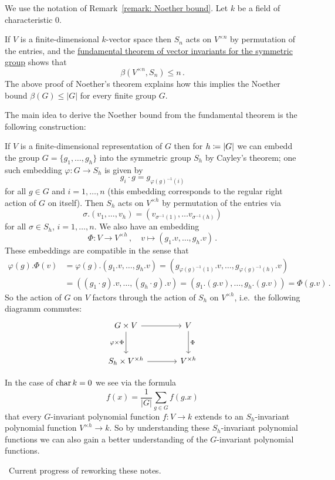 \begin{fluff}
  We use the notation of Remark~\ref{remark: Noether bound}.
  Let $k$ be a field of characteristic $0$.
  
  If $V$ is a finite-dimensional $k$-vector space then $S_n$ acts on $V^{\times n}$ by permutation of the entries, and the \hyperref[theorem: fundamental theorem of vector invariants for the symmetric group]{fundamental theorem of vector invariants for the symmetric group} shows that
  \[
          \beta(V^{\times n}, S_n)
    \leq  n \,.
  \]
  The above proof of Noether’s theorem explains how this implies the Noether bound $\beta(G) \leq |G|$ for every finite group $G$.
  
  The main idea to derive the Noether bound from the fundamental theorem is the following construction:
  
  If $V$ is a finite-dimensional representation of $G$ then for $h \coloneqq |G|$ we can embedd the group $G = \{g_1, \dotsc, g_h\}$ into the symmetric group $S_h$ by Cayley’s theorem;
  one such embedding $\varphi \colon G \to S_h$ is given by
  \[
    g_i \cdot g
    = g_{\varphi(g)^{-1}(i)}
  \]
  for all $g \in G$ and $i = 1, \dotsc, n$ (this embedding corresponds to the regular right action of $G$ on itself).
  Then $S_h$ acts on $V^{\times h}$ by permutation of the entries via
  \[
      \sigma.(v_1, \dotsc, v_h)
    = (v_{\sigma^{-1}(1)}, \dotsc v_{\sigma^{-1}(h)})
  \]
  for all $\sigma \in S_h$, $i = 1, \dotsc, n$.
  We also have an embedding
  \[
            \Phi
    \colon  V
    \to     V^{\times h} \,,
    \quad   v
    \mapsto \left( g_1.v, \dotsc, g_h.v \right) \,.
  \]
  These embeddings are compatible in the sense that
  \begin{align*}
        \varphi(g).\Phi(v)
    &=  \varphi(g).(g_1.v, \dotsc, g_h.v)
     =  \left( g_{\varphi(g)^{-1}(1)}.v, \dotsc, g_{\varphi(g)^{-1}(h)}.v \right) \\
    &=  ( (g_1 \cdot g).v, \dotsc, (g_h \cdot g).v )
     =  ( g_1.(g.v), \dotsc, g_h.(g.v) )
     =  \Phi(g.v) \,.
  \end{align*}
  So the action of $G$ on $V$ factors through the action of $S_h$ on $V^{\times h}$, i.e.\ the following diagramm commutes:
  \[
    \begin{tikzcd}[sep = large]
        G \times V
        \arrow{r}
        \arrow{d}[left]{\varphi \times \Phi}
      & V
        \arrow{d}[right]{\Phi}
      \\
        S_h \times V^{\times h}
        \arrow{r}
      & V^{\times h}
    \end{tikzcd}
  \]

  
  In the case of $\operatorname{char}{k} = 0$ we see via the formula
  \[
      f(x)
    = \frac{1}{|G|} \sum_{g \in G} f(g.x)
  \]
  that every $G$-invariant polynomial function $f \colon V \to k$ extends to an $S_h$-invariant polynomial function $V^{\times h} \to k$.
  So by understanding these $S_h$-invariant polynomial functions we can also gain a better understanding of the $G$-invariant polynomial functions.
\end{fluff}





\noindent\hrulefill \, Current progress of reworking these notes. \hrulefill




